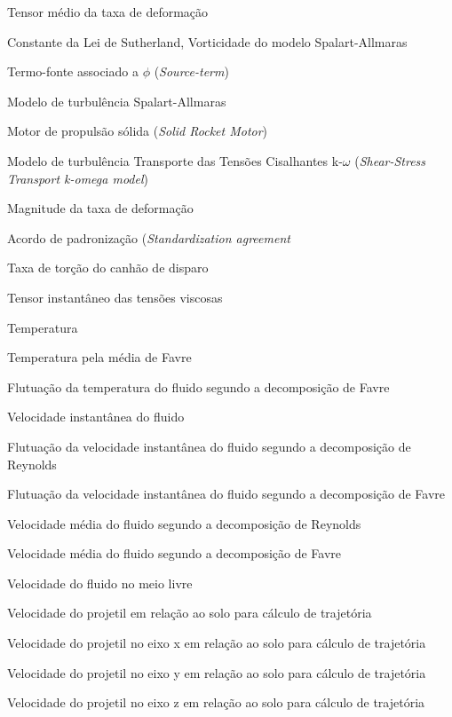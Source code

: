 \begin{siglas}
    \item[\(S_{ij}\)] Tensor médio da taxa de deformação
    \item[\(S\)] Constante da Lei de Sutherland, Vorticidade do modelo Spalart-Allmaras
    \item[\(S_{\phi}\)] Termo-fonte associado a $\phi$ (\textit{Source-term})
    \item[S-A] Modelo de turbulência Spalart-Allmaras
    \item[SRM] Motor de propulsão sólida (\textit{Solid Rocket Motor})
    \item[SST k-$\omega\)] Modelo de turbulência Transporte das Tensões Cisalhantes k-$\omega$ (\textit{Shear-Stress Transport k-omega model})
    \item[\(S_t\)] Magnitude da taxa de deformação
    \item[STANAG] Acordo de padronização (\textit{Standardization agreement}
    \item[\(t_c\)] Taxa de torção do canhão de disparo
    \item[\(t_{ij}\)] Tensor instantâneo das tensões viscosas
    \item[\(T\)] Temperatura
    \item[\(\Tilde{T}\)] Temperatura pela média de Favre
    \item[\(T''\)] Flutuação da temperatura do fluido segundo a decomposição de Favre
    \item[\(u_i\)] Velocidade instantânea do fluido
    \item[\(u'_i\)] Flutuação da velocidade instantânea do fluido segundo a decomposição de Reynolds
    \item[\(u''_i\)] Flutuação da velocidade instantânea do fluido segundo a decomposição de Favre
    \item[\(U_i\)] Velocidade média do fluido segundo a decomposição de Reynolds
    \item[\(\Tilde{u}_i\)] Velocidade média do fluido segundo a decomposição de Favre
    \item[\(U_\infty\)] Velocidade do fluido no meio livre
    \item[\(U_{solo}\)] Velocidade do projetil em relação ao solo para cálculo de trajetória
    \item[\(U_{x_{solo}}\)] Velocidade do projetil no eixo x em relação ao solo para cálculo de trajetória
    \item[\(U_{y_{solo}}\)] Velocidade do projetil no eixo y em relação ao solo para cálculo de trajetória
    \item[\(U_{z_{solo}}\)] Velocidade do projetil no eixo z em relação ao solo para cálculo de trajetória

\end{siglas}
